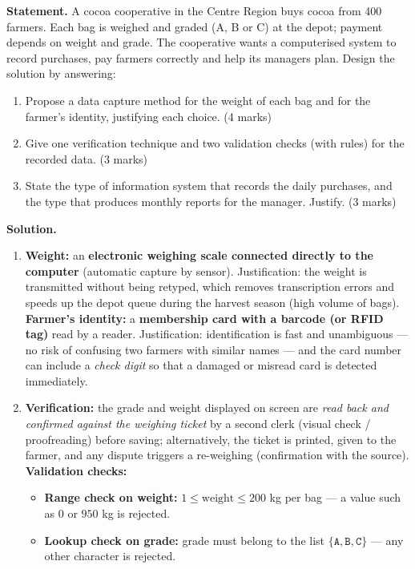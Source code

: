 \documentclass[11pt]{article}
\begin{document}
\begin{exoresolu}
\textbf{Statement.} A cocoa cooperative in the Centre Region buys cocoa from 400 farmers. Each bag is weighed and graded (A, B or C) at the depot; payment depends on weight and grade. The cooperative wants a computerised system to record purchases, pay farmers correctly and help its managers plan.
Design the solution by answering:
\begin{enumerate}
\item[a)] Propose a data capture method for the weight of each bag and for the farmer's identity, justifying each choice. \hfill (4 marks)
\item[b)] Give one verification technique and two validation checks (with rules) for the recorded data. \hfill (3 marks)
\item[c)] State the type of information system that records the daily purchases, and the type that produces monthly reports for the manager. Justify. \hfill (3 marks)
\end{enumerate}
\tcblower
\textbf{Solution.}
\begin{enumerate}
\item[a)] \textbf{Weight:} an \textbf{electronic weighing scale connected directly to the computer} (automatic capture by sensor). Justification: the weight is transmitted without being retyped, which removes transcription errors and speeds up the depot queue during the harvest season (high volume of bags).
\textbf{Farmer's identity:} a \textbf{membership card with a barcode (or RFID tag)} read by a reader. Justification: identification is fast and unambiguous — no risk of confusing two farmers with similar names — and the card number can include a \emph{check digit} so that a damaged or misread card is detected immediately.
\item[b)] \textbf{Verification:} the grade and weight displayed on screen are \emph{read back and confirmed against the weighing ticket} by a second clerk (visual check / proofreading) before saving; alternatively, the ticket is printed, given to the farmer, and any dispute triggers a re-weighing (confirmation with the source).
\textbf{Validation checks:}
\begin{itemize}
\item \textbf{Range check on weight:} $1 \le \text{weight} \le 200$ kg per bag — a value such as $0$ or $950$ kg is rejected.
\item \textbf{Lookup check on grade:} grade must belong to the list $\{\texttt{A}, \texttt{B}, \texttt{C}\}$ — any other character is rejected.

\end{itemize}
\end{enumerate}
\end{exoresolu}
\end{document}
